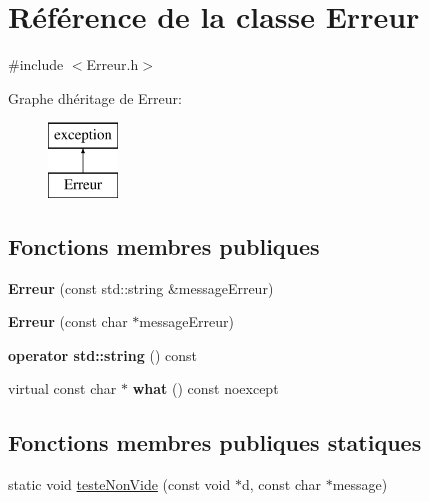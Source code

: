 \hypertarget{class_erreur}{}\section{Référence de la classe Erreur}
\label{class_erreur}


{\ttfamily \#include $<$Erreur.\+h$>$}

Graphe d\textquotesingle{}héritage de Erreur\+:\begin{figure}[H]
\begin{center}
\leavevmode
\includegraphics[height=2.000000cm]{class_erreur}
\end{center}
\end{figure}
\subsection*{Fonctions membres publiques}
\begin{DoxyCompactItemize}
\item 
\mbox{\label{class_erreur_a73d8d3c713bc18afd6a38cf337dfbb40}} 
{\bfseries Erreur} (const std\+::string \&message\+Erreur)
\item 
\mbox{\label{class_erreur_a15bbbbc7e23e4ea5e6bdebe8e299e6be}} 
{\bfseries Erreur} (const char $\ast$message\+Erreur)
\item 
\mbox{\label{class_erreur_a3a6fad6fcd3013b877c8ee838445ebec}} 
{\bfseries operator std\+::string} () const
\item 
\mbox{\label{class_erreur_a6843f7a2b86078ec1318548903d15326}} 
virtual const char $\ast$ {\bfseries what} () const noexcept
\end{DoxyCompactItemize}
\subsection*{Fonctions membres publiques statiques}
\begin{DoxyCompactItemize}
\item 
static void \mbox{\hyperlink{class_erreur_ad318a27a06c5c1f68506eb00b9fe6beb}{teste\+Non\+Vide}} (const void $\ast$d, const char $\ast$message)
\end{DoxyCompactItemize}
